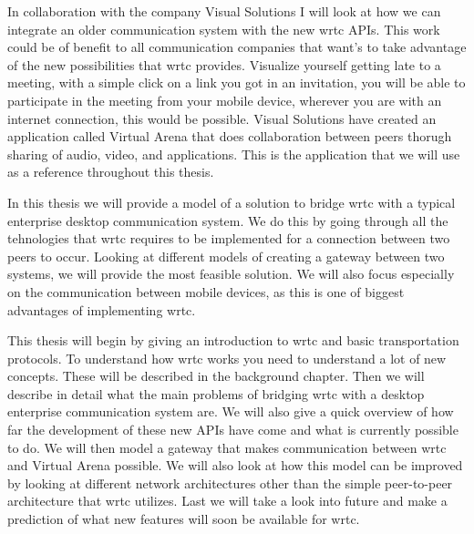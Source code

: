 In collaboration with the company Visual Solutions I will look at how we can integrate an older communication system with the new \gls{wrtc} APIs. This work could be of benefit to all communication companies that want's to take advantage of the new possibilities that \gls{wrtc} provides. Visualize yourself getting late to a meeting, with a simple click on a link you got in an invitation, you will be able to participate in the meeting from your mobile device, wherever you are with an internet connection, this would be possible. Visual Solutions have created an application called Virtual Arena that does collaboration between peers thorugh sharing of audio, video, and applications. This is the application that we will use as a reference throughout this thesis.

In this thesis we will provide a model of a solution to bridge \gls{wrtc} with a typical enterprise desktop communication system. We do this by going through all the tehnologies that \gls{wrtc} requires to be implemented for a connection between two peers to occur. Looking at different models of creating a gateway between two systems, we will provide the most feasible solution. We will also focus especially on the communication between mobile devices, as this is one of biggest advantages of implementing \gls{wrtc}.

This thesis will begin by giving an introduction to \gls{wrtc} and basic transportation protocols. To understand how \gls{wrtc} works you need to understand a lot of new concepts. These will be described in the background chapter. Then we will describe in detail what the main problems of bridging \gls{wrtc} with a desktop enterprise communication system are. We will also give a quick overview of how far the development of these new APIs have come and what is currently possible to do. We will then model a gateway that makes communication between \gls{wrtc} and Virtual Arena possible. We will also look at how this model can be improved by looking at different network architectures other than the simple peer-to-peer architecture that \gls{wrtc} utilizes. Last we will take a look into future and make a prediction of what new features will soon be available for \gls{wrtc}.